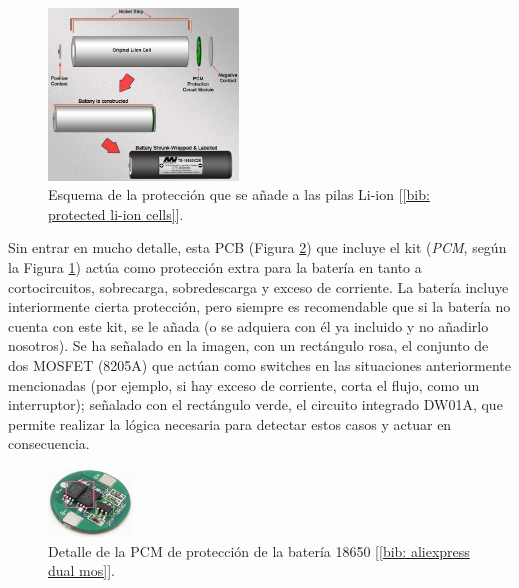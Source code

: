 \documentclass[12pt]{article}
\begin{document}
	\begin{figure}[h!]
		\begin{center}
			\includegraphics[width=0.45\textwidth]{img/construction_prot_circuit.png}
			\caption{Esquema de la protección que se añade a las pilas Li-ion [\ref{bib: protected li-ion cells}].}
			\label{Proteccion Li-Ion}
		\end{center}
	\end{figure}
	
	\pagebreak
	
	\noindent Sin entrar en mucho detalle, esta PCB (Figura \ref{PCB proteccion Li-Ion}) que incluye el kit (\textit{PCM}, según la Figura \ref{Proteccion Li-Ion})  actúa como protección extra para la batería en tanto a cortocircuitos, sobrecarga, sobredescarga y exceso de corriente. La batería incluye interiormente cierta protección, pero siempre es recomendable que si la batería no cuenta con este kit, se le añada (o se adquiera con él ya incluido y no añadirlo nosotros). Se ha señalado en la imagen, con un rectángulo rosa, el conjunto de dos MOSFET (8205A) que actúan como switches en las situaciones anteriormente mencionadas (por ejemplo, si hay exceso de corriente, corta el flujo, como un interruptor); señalado con el rectángulo verde, el circuito integrado DW01A, que permite realizar la lógica necesaria para detectar estos casos y actuar en consecuencia. 
	
	\begin{figure}[h!]
		\begin{center}
			\includegraphics[width=0.2\textwidth]{img/batt_prot_circuit_zoom_edited.png}
			\caption{Detalle de la PCM de protección de la batería 18650 [\ref{bib: aliexpress dual mos}].}
			\label{PCB proteccion Li-Ion}
		\end{center}
	\end{figure}
	
\end{document}
